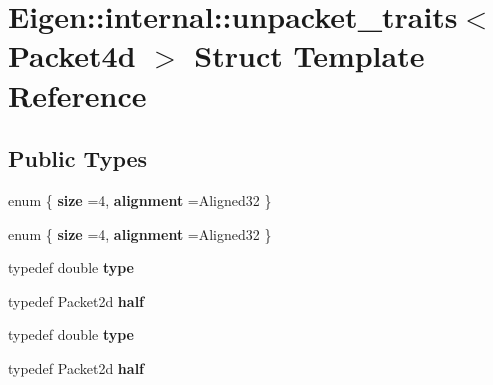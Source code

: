 \hypertarget{struct_eigen_1_1internal_1_1unpacket__traits_3_01_packet4d_01_4}{}\section{Eigen\+:\+:internal\+:\+:unpacket\+\_\+traits$<$ Packet4d $>$ Struct Template Reference}
\label{struct_eigen_1_1internal_1_1unpacket__traits_3_01_packet4d_01_4}
\subsection*{Public Types}
\begin{DoxyCompactItemize}
\item 
\mbox{\label{struct_eigen_1_1internal_1_1unpacket__traits_3_01_packet4d_01_4_a207f3cdb6b7305e2ccb5f7c9a2d5905c}} 
enum \{ {\bfseries size} =4, 
{\bfseries alignment} =Aligned32
 \}
\item 
\mbox{\label{struct_eigen_1_1internal_1_1unpacket__traits_3_01_packet4d_01_4_adc90a99f4c3339dc54e5d54a6d0ae4e3}} 
enum \{ {\bfseries size} =4, 
{\bfseries alignment} =Aligned32
 \}
\item 
\mbox{\label{struct_eigen_1_1internal_1_1unpacket__traits_3_01_packet4d_01_4_a5d4b00a7b2e32823f98d5512ae0a3232}} 
typedef double {\bfseries type}
\item 
\mbox{\label{struct_eigen_1_1internal_1_1unpacket__traits_3_01_packet4d_01_4_a3ab8dc625e16c478ef0373ba62544827}} 
typedef Packet2d {\bfseries half}
\item 
\mbox{\label{struct_eigen_1_1internal_1_1unpacket__traits_3_01_packet4d_01_4_a5d4b00a7b2e32823f98d5512ae0a3232}} 
typedef double {\bfseries type}
\item 
\mbox{\label{struct_eigen_1_1internal_1_1unpacket__traits_3_01_packet4d_01_4_a3ab8dc625e16c478ef0373ba62544827}} 
typedef Packet2d {\bfseries half}
\end{DoxyCompactItemize}



